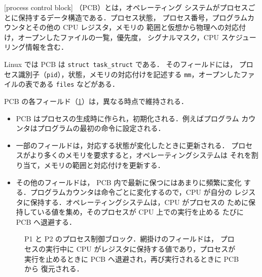 \documentclass[../main.tex]{subfiles}
\begin{document}
\begin{definition}[プロセス制御ブロック]
  [process control block]%
  （PCB）とは，オペレーティング
  システムがプロセスごとに保持するデータ構造である．プロセス状態，
  プロセス番号，プログラムカウンタとその他の CPU レジスタ，メモリの
  範囲と仮想から物理への対応付け，オープンしたファイルの一覧，優先度，
  シグナルマスク，CPU スケジューリング情報を含む．
\end{definition}

Linux では PCB は \texttt{struct task\_struct} である．%
そのフィールドには，
プロセス識別子（\texttt{pid}），状態，メモリの対応付けを記述する
\texttt{mm}，オープンしたファイルの表である \texttt{files} などがある．

PCB の各フィールド（\cref{fig:l02-pcb}）は，異なる時点で維持される．
\begin{itemize}

  \item PCB はプロセスの生成時に作られ，初期化される．例えばプログラム
    カウンタはプログラムの最初の命令に設定される．
  \item 一部のフィールドは，対応する状態が変化したときに更新される．
    プロセスがより多くのメモリを要求すると，オペレーティングシステムは
    それを割り当て，メモリの範囲と対応付けを更新する．
  \item その他のフィールドは，%
    PCB 内で最新に保つにはあまりに頻繁に変化
    する．プログラムカウンタは命令ごとに変化するので，CPU が自分の
    レジスタに保持する．オペレーティングシステムは，CPU がプロセスの
    ために保持している値を集め，そのプロセスが CPU 上での実行を止める
    たびに PCB へ退避する．
\end{itemize}

\begin{figure}[htbp]
  \centering
  
  \caption{P1 と P2 のプロセス制御ブロック．網掛けのフィールドは，
    プロセスの実行中に CPU がレジスタに保持する値であり，プロセスが
    実行を止めるときに PCB へ退避され，再び実行されるときに PCB から
    復元される．}
  \label{fig:l02-pcb}
\end{figure}
\end{document}
